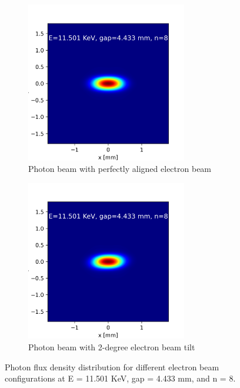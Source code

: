 \documentclass[a4paper,12pt]{article}
\begin{document}
\begin{figure}[H]
\centering
\begin{subfigure}{0.4\textwidth}
\includegraphics[width=1\linewidth, height=7cm]{photonbeam_right_E=11.501 KeV, gap=4.433 mm, n=8.png} 
\caption{Photon beam with perfectly aligned electron beam}
\end{subfigure}
\begin{subfigure}{0.4\textwidth}
\includegraphics[width=1\linewidth, height=7cm]{photonbeam_tilted_E=11.501 KeV, gap=4.433 mm, n=8.png}
\caption{Photon beam with 2-degree electron beam tilt}
\end{subfigure}
\caption{Photon flux density distribution for different electron beam configurations at E = 11.501 KeV, gap = 4.433 mm, and n = 8.}
\label{fig:ressonance}
\end{figure}
            
\end{document}
